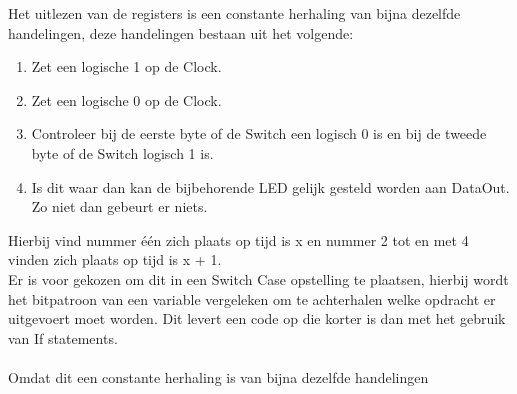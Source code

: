 Het uitlezen van de registers is een constante herhaling van bijna dezelfde handelingen, deze handelingen bestaan uit het volgende:
\begin{enumerate}
	\item Zet een logische 1 op de Clock.
	\item Zet een logische 0 op de Clock. 
	\item Controleer bij de eerste byte of de Switch een logisch 0 is en bij de tweede byte of de Switch logisch 1 is.
	\item Is dit waar dan kan de bijbehorende LED gelijk gesteld worden aan DataOut.
	Zo niet dan gebeurt er niets.
\end{enumerate}
Hierbij vind nummer één zich plaats op tijd is x en nummer 2 tot en met 4 vinden zich plaats op tijd is x + 1.\\

Er is voor gekozen om dit in een Switch Case opstelling te plaatsen, hierbij wordt het bitpatroon van een variable vergeleken om te achterhalen welke opdracht er uitgevoert moet worden. Dit levert een code op die korter is dan met het gebruik van If statements.\\\\


Omdat dit een constante herhaling is van bijna dezelfde handelingen 